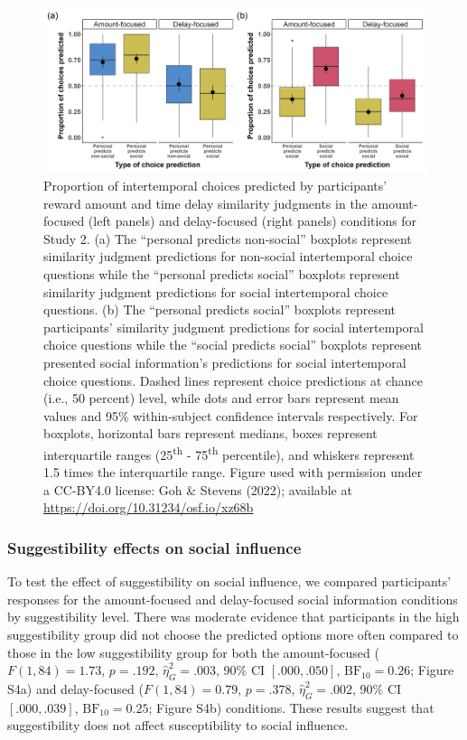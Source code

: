 \documentclass[
  pub,floatsintext]{apa6}
\begin{document}
\begin{figure}
\includegraphics[width=1\linewidth]{figures/sim_judgment_predictions_combined_2} \caption{Proportion of intertemporal choices predicted by participants' reward amount and time delay similarity judgments in the amount-focused (left panels) and delay-focused (right panels) conditions for Study 2. (a) The ``personal predicts non-social'' boxplots represent similarity judgment predictions for non-social intertemporal choice questions while the ``personal predicts social'' boxplots represent similarity judgment predictions for social intertemporal choice questions. (b) The ``personal predicts social'' boxplots represent participants' similarity judgment predictions for social intertemporal choice questions while the ``social predicts social'' boxplots represent presented social information's predictions for social intertemporal choice questions. Dashed lines represent choice predictions at chance (i.e., 50 percent) level, while dots and error bars represent mean values and 95\% within-subject confidence intervals respectively. For boxplots, horizontal bars represent medians, boxes represent interquartile ranges (25\textsuperscript{th} - 75\textsuperscript{th} percentile), and whiskers represent 1.5 times the interquartile range. Figure used with permission under a CC-BY4.0 license: Goh \& Stevens (2022); available at \url{https://doi.org/10.31234/osf.io/xz68b}}\label{fig:simjudgmentsocialinfopredictions2}
\end{figure}

\hypertarget{suggestibility-effects-on-social-influence-1}{%
\subsubsection{Suggestibility effects on social influence}\label{suggestibility-effects-on-social-influence-1}}

To test the effect of suggestibility on social influence, we compared participants' responses for the amount-focused and delay-focused social information conditions by suggestibility level. There was moderate evidence that participants in the high suggestibility group did not choose the predicted options more often compared to those in the low suggestibility group for both the amount-focused (\(F(1, 84) = 1.73\), \(p = .192\), \(\hat{\eta}^2_G = .003\), 90\% CI \([.000, .050]\), \(\mathrm{BF}_{\textrm{10}} = 0.26\); Figure S4a) and delay-focused (\(F(1, 84) = 0.79\), \(p = .378\), \(\hat{\eta}^2_G = .002\), 90\% CI \([.000, .039]\), \(\mathrm{BF}_{\textrm{10}} = 0.25\); Figure S4b) conditions. These results suggest that suggestibility does not affect susceptibility to social influence.
\end{document}
